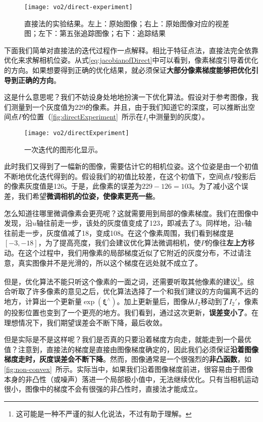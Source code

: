 \begin{figure}[!htp]
	\centering
	\texttt{[image: vo2/direct-experiment]}
	\caption{直接法的实验结果。左上：原始图像；右上：原始图像对应的视差图；左下：第五张追踪图像；右下：追踪结果}
	\label{fig:direct-experiment}
\end{figure}

下面我们简单对直接法的迭代过程作一点解释。相比于特征点法，直接法完全依靠优化来求解相机位姿。从式\eqref{eq:jacobianofDirect}中可以看到，像素梯度引导着优化的方向。如果想要得到正确的优化结果，就必须保证\textbf{大部分像素梯度能够把优化引导到正确的方向}。

这是什么意思呢？我们不妨设身处地地扮演一下优化算法。假设对于参考图像，我们测量到一个灰度值为229的像素。并且，由于我们知道它的深度，可以推断出空间点$P$的位置（\autoref{fig:directExperiment}~所示在$I_1$中测量到的灰度）。

\begin{figure}[!htp]
	\centering
	\texttt{[image: vo2/directExperiment]}
	\caption{一次迭代的图形化显示。}
	\label{fig:directExperiment}
\end{figure}

此时我们又得到了一幅新的图像，需要估计它的相机位姿。这个位姿是由一个初值不断地优化迭代得到的。假设我们的初值比较差，在这个初值下，空间点$P$投影后的像素灰度值是126。于是，此像素的误差为$229-126=103$。为了减小这个误差，我们希望\textbf{微调相机的位姿，使像素更亮一些}。

怎么知道往哪里微调像素会更亮呢？这就需要用到局部的像素梯度。我们在图像中发现，沿$u$轴往前走一步，该处的灰度值变成了123，即减去了3。同样地，沿$v$轴往前走一步，灰度值减了18，变成108。在这个像素周围，我们看到梯度是$[-3,-18]$，为了提高亮度，我们会建议优化算法微调相机，使$P$的像往\textbf{左上方}移动。在这个过程中，我们用像素的局部梯度近似了它附近的灰度分布，不过请注意，真实图像并不是光滑的，所以这个梯度在远处就不成立了。

但是，优化算法不能只听这个像素的一面之词，还需要听取其他像素的建议\footnote{这可能是一种不严谨的拟人化说法，不过有助于理解。}。综合听取了许多像素的意见之后，优化算法选择了一个和我们建议的方向偏离不远的地方，计算出一个更新量$\exp ({\bm{\xi}^\wedge } )$。加上更新量后，图像从$I_2$移动到了$I_2'$，像素的投影位置也变到了一个更亮的地方。我们看到，通过这次更新，\textbf{误差变小了}。在理想情况下，我们期望误差会不断下降，最后收敛。

但是实际是不是这样呢？我们是否真的只要沿着梯度方向走，就能走到一个最优值？注意到，直接法的梯度是直接由图像梯度确定的，因此我们必须保证\textbf{沿着图像梯度走时，灰度误差会不断下降}。然而，图像通常是一个很强烈的\textbf{非凸函数}，如\autoref{fig:non-convex}~所示。实际当中，如果我们沿着图像梯度前进，很容易由于图像本身的非凸性（或噪声）落进一个局部极小值中，无法继续优化。只有当相机运动很小，图像中的梯度不会有很强的非凸性时，直接法才能成立。

